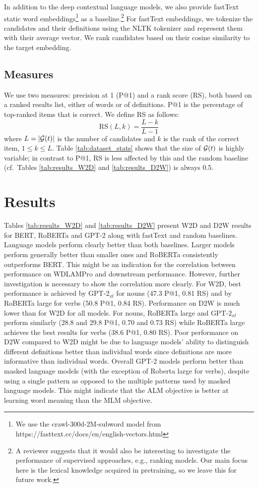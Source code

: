 \documentclass[11pt,a4paper]{article}
\begin{document}
In addition to the deep contextual language
models, we also provide  fastText static 
word embeddings\footnote{We use the crawl-300d-2M-subword
model from
https://fasttext.cc/docs/en/english-vectors.html}
\cite{mikolov18fastText} as a baseline.\footnote{A
reviewer suggests that it would also be interesting to
investigate the performance of supervised approaches,
e.g., ranking models. Our main
focus here is the lexical knowledge acquired in
pretraining, so we leave this for future work.} For fastText embeddings, we
tokenize the candidates and their definitions using the
NLTK tokenizer and represent them with their average
vector. We rank candidates based on their cosine
similarity to the target embedding.
%

\subsection{Measures}
We use two measures: precision at 1 (P@1) and a rank score
(RS), both based on a ranked results list, either of words
or of definitions. P@1 is the percentage of top-ranked items
that is correct.
We define RS as follows:  
\begin{equation*}
    \text{RS}(L,k) = \frac{L-k}{L-1}
\end{equation*}
where $L=|{\cal G}(t)|$ is the number of candidates  and
$k$ is the rank of the correct item, $1 \leq k \leq L$.
Table \ref{tab:dataset_stats} shows that the size of ${\cal G}(t)$
is highly variable;
in contrast to P@1, RS is less affected by
this and the random baseline (cf.\ Tables
\ref{tab:results_W2D}
and \ref{tab:results_D2W}) is always 0.5.  

\section{Results}

Tables \ref{tab:results_W2D} and 
\ref{tab:results_D2W} present
W2D and D2W
results for
BERT, RoBERTa and GPT-2 along with fastText and random baselines. Language models perform clearly better than both baselines.
Larger models perform generally better than smaller
ones and RoBERTa consistently outperforms BERT.
This might be an indication for the correlation between performance on WDLAMPro and downstream performance. However, further investigation is necessary to show the correlation more clearly.
For W2D, best performance is achieved by GPT-2$_{xl}$  for nouns (47.3 P@1, 0.81 RS) and by RoBERTa large for  verbs (50.8 P@1, 0.84 RS). 
Performance on D2W is much lower than for W2D for all models. 
For nouns, RoBERTa large and GPT-2$_{xl}$ perform similarly (28.8 and 29.8 P@1, 0.70 and 0.73 RS) while RoBERTa large achieves the best results for verbs (38.6 P@1, 0.80 RS).
Poor performance on D2W compared to W2D might be due to language models' ability to distinguish different definitions better than individual words since definitions are more informative  than individual words. 
Overall GPT-2 models perform better than
masked language models (with the exception of Roberta
large for verbs), despite using a single pattern as
opposed to the multiple patterns used by masked language
models. This might indicate that the ALM objective is
better at learning word meaning than the MLM objective.
\end{document}
